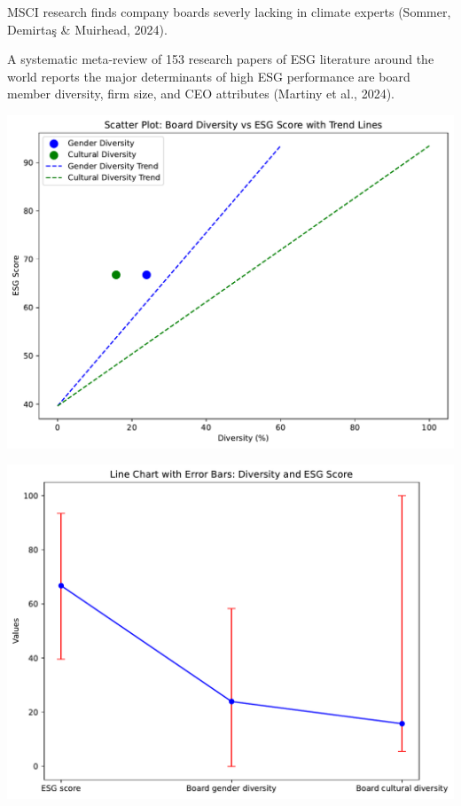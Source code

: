 \documentclass[
  letterpaper,
  DIV=11,
  numbers=noendperiod]{scrartcl}
\begin{document}
MSCI research finds company boards severly lacking in climate experts
(Sommer, Demirtaş \& Muirhead, 2024).

A systematic meta-review of 153 research papers of ESG literature around
the world reports the major determinants of high ESG performance are
board member diversity, firm size, and CEO attributes (Martiny et al.,
2024).

\includegraphics{_thesis_files/figure-pdf/cell-57-output-1.pdf}

\includegraphics{_thesis_files/figure-pdf/cell-57-output-2.pdf}
\end{document}
